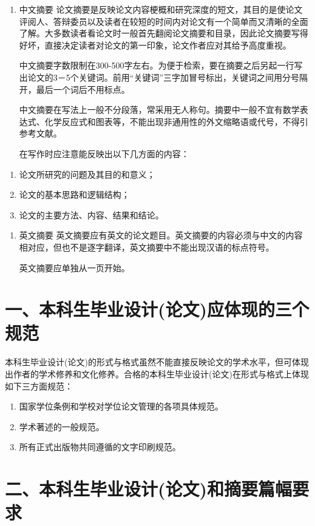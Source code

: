 \documentclass{cupb-thesis}
\begin{document}
\begin{enumerate}[label=\arabic*.]
  \item 中文摘要
论文摘要是反映论文内容梗概和研究深度的短文，其目的是使论文评阅人、答辩委员以及读者在较短的时间内对论文有一个简单而又清晰的全面了解。大多数读者看论文时一般首先翻阅论文摘要和目录，因此论文摘要写得好坏，直接决定读者对论文的第一印象，论文作者应对其给予高度重视。

中文摘要字数限制在300-500字左右。为便于检索，要在摘要之后另起一行写出论文的3－5个关键词。前用“关键词”三字加冒号标出，关键词之间用分号隔开，最后一个词后不用标点。

中文摘要在写法上一般不分段落，常采用无人称句。摘要中一般不宜有数学表达式、化学反应式和图表等，不能出现非通用性的外文缩略语或代号，不得引参考文献。

在写作时应注意能反映出以下几方面的内容：

\end{enumerate}
\begin{enumerate}[label=（\arabic*）]
  \item 论文所研究的问题及其目的和意义；
  \item 论文的基本思路和逻辑结构；
  \item 论文的主要方法、内容、结果和结论。
\end{enumerate}
\begin{enumerate}[label=\arabic*.]
  \item 英文摘要
英文摘要应有英文的论文题目。英文摘要的内容必须与中文的内容相对应，但也不是逐字翻译，英文摘要中不能出现汉语的标点符号。

英文摘要应单独从一页开始。

\end{enumerate}
\section{一、本科生毕业设计(论文)应体现的三个规范}

本科生毕业设计(论文)的形式与格式虽然不能直接反映论文的学术水平，但可体现出作者的学术修养和文化修养。合格的本科生毕业设计(论文)在形式与格式上体现如下三方面规范：

\begin{enumerate}[label=\arabic*.]
  \item 国家学位条例和学校对学位论文管理的各项具体规范。
  \item 学术著述的一般规范。
  \item 所有正式出版物共同遵循的文字印刷规范。
\end{enumerate}
\section{二、本科生毕业设计(论文)和摘要篇幅要求}
\end{document}
